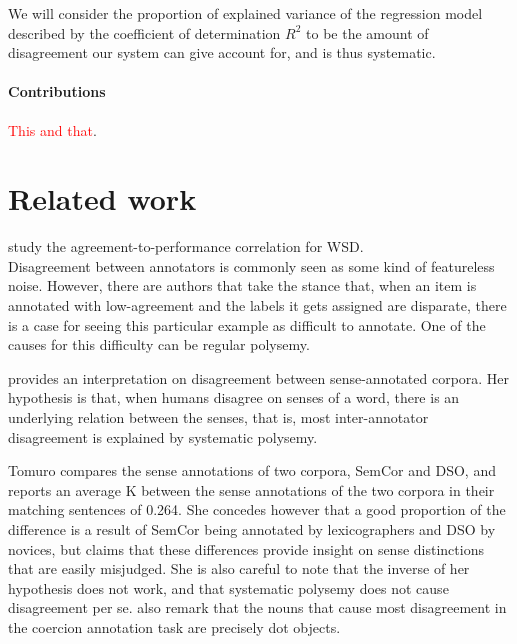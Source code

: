 \documentclass[11pt,a4paper]{article}
\begin{document}
We will consider the proportion of explained variance of the regression model described by the coefficient of determination $R^2$ to be the amount of disagreement our system can give account for, and is thus systematic. 

\paragraph{Contributions} \textcolor{red}{This and that}.

\section{Related work}


\cite{Plank2014} 

\cite{Jurgens2014}

\cite{Passonneau2014}

\cite{Jurgens2013}

\cite{Lopez2015} study the agreement-to-performance correlation for WSD. \\

Disagreement between annotators is commonly seen as some kind of featureless noise. However, there are authors that take the stance that, when an item is annotated with low-agreement and the labels it gets assigned are disparate, there is a case for seeing this particular example as difficult to annotate. One of the causes for this difficulty can be regular polysemy.

\cite{Tomuro2001a} provides an interpretation on disagreement between sense-annotated corpora. Her hypothesis is that, when humans disagree on senses of a word, there is an underlying relation between the senses, that is, most inter-annotator disagreement is explained by systematic polysemy. 

Tomuro compares the sense annotations of two corpora, SemCor and DSO, and reports an average K between the sense annotations of the two corpora in their matching sentences of 0.264. She concedes however that a good proportion of the difference is a result of SemCor being annotated by lexicographers and DSO by novices, but claims that these differences provide insight on sense distinctions that are easily misjudged. She is also careful to note that the inverse of her hypothesis does not work, and that systematic polysemy does not cause disagreement per se.  \cite{Jezek2010} also remark that the nouns that cause most disagreement in the coercion annotation task are precisely dot objects.
\end{document}

